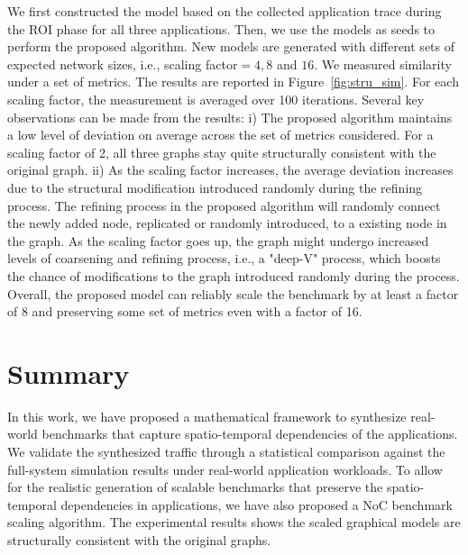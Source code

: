 \indent We first constructed the model based on the collected application trace during the ROI phase for all three applications. Then, we use the models as seeds to perform the proposed algorithm. New models are generated with different sets of expected network sizes, i.e., scaling factor$=4, 8$ and $16$. We measured similarity under a set of metrics. The results are reported in Figure~\ref{fig:stru_sim}. For each scaling factor, the measurement is averaged over 100 iterations. Several key observations can be made from the results: i) The proposed algorithm maintains a low level of deviation on average across the set of metrics considered. For a scaling factor of 2, all three graphs stay quite structurally consistent with the original graph. ii) As the scaling factor increases, the average deviation increases due to the structural modification introduced randomly during the refining process. The refining process in the proposed algorithm will randomly connect the newly added node, replicated or randomly introduced, to a existing node in the graph. As the scaling factor goes up, the graph might undergo increased levels of coarsening and refining process, i.e., a "deep-V" process, which boosts the chance of modifications to the graph introduced randomly during the process. Overall, the proposed model can reliably scale the benchmark by at least a factor of 8 and preserving some set of metrics even with a factor of 16.
\section{Summary}
In this work, we have proposed a mathematical framework to synthesize real-world benchmarks that capture spatio-temporal dependencies of the applications. We validate the synthesized traffic through a statistical comparison against the full-system simulation results under real-world application workloads. To allow for the realistic generation of scalable benchmarks that preserve the spatio-temporal dependencies in applications, we have also proposed a NoC benchmark scaling algorithm. The experimental results shows the scaled graphical models are structurally consistent with the original graphs.
